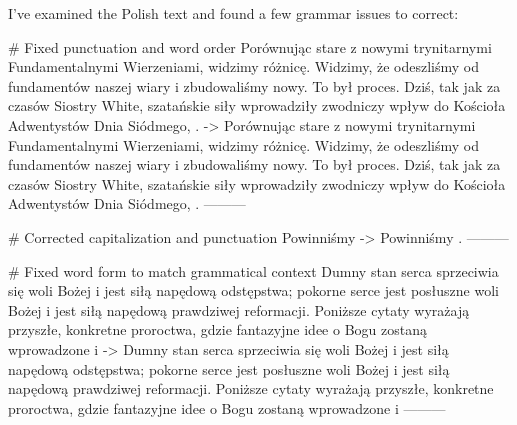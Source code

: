 I've examined the Polish text and found a few grammar issues to correct:

# Fixed punctuation and word order
Porównując stare  z nowymi trynitarnymi Fundamentalnymi Wierzeniami, widzimy różnicę. Widzimy, że odeszliśmy od fundamentów naszej wiary i zbudowaliśmy nowy. To był proces. Dziś, tak jak za czasów Siostry White, szatańskie siły wprowadziły zwodniczy wpływ do Kościoła Adwentystów Dnia Siódmego, .
->
Porównując stare  z nowymi trynitarnymi Fundamentalnymi Wierzeniami, widzimy różnicę. Widzimy, że odeszliśmy od fundamentów naszej wiary i zbudowaliśmy nowy. To był proces. Dziś, tak jak za czasów Siostry White, szatańskie siły wprowadziły zwodniczy wpływ do Kościoła Adwentystów Dnia Siódmego, .
---------

# Corrected capitalization and punctuation
Powinniśmy 
->
Powinniśmy .
---------

# Fixed word form to match grammatical context
Dumny stan serca sprzeciwia się woli Bożej i jest siłą napędową odstępstwa; pokorne serce jest posłuszne woli Bożej i jest siłą napędową prawdziwej reformacji. Poniższe cytaty wyrażają przyszłe, konkretne proroctwa, gdzie fantazyjne idee o Bogu zostaną wprowadzone i 
->
Dumny stan serca sprzeciwia się woli Bożej i jest siłą napędową odstępstwa; pokorne serce jest posłuszne woli Bożej i jest siłą napędową prawdziwej reformacji. Poniższe cytaty wyrażają przyszłe, konkretne proroctwa, gdzie fantazyjne idee o Bogu zostaną wprowadzone i 
---------